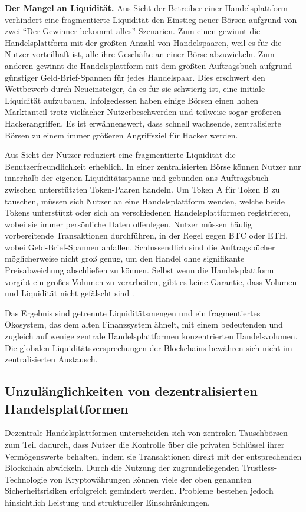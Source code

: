 \documentclass[UTF8,nofonts]{article}
\begin{document}
\begin{multicols}{2}
\textbf{Der Mangel an Liquidität.} Aus Sicht der Betreiber einer Handelsplattform verhindert eine fragmentierte Liquidität den Einstieg neuer Börsen aufgrund von zwei \enquote{Der Gewinner bekommt alles}-Szenarien. Zum einen gewinnt die Handelsplattform mit der größten Anzahl von Handelspaaren, weil es für die Nutzer vorteilhaft ist, alle ihre Geschäfte an einer Börse abzuwickeln. Zum anderen gewinnt die Handelsplattform mit dem größten Auftragsbuch aufgrund günstiger Geld-Brief-Spannen für jedes Handelspaar. Dies erschwert den Wettbewerb durch Neueinsteiger, da es für sie schwierig ist, eine initiale Liquidität aufzubauen. Infolgedessen haben einige Börsen einen hohen Marktanteil trotz vielfacher Nutzerbeschwerden und teilweise sogar größeren Hackerangriffen. Es ist erwähnenswert, dass schnell wachsende, zentralisierte Börsen zu einem immer größeren Angriffsziel für Hacker werden.

Aus Sicht der Nutzer reduziert eine fragmentierte Liquidität die Benutzerfreundlichkeit erheblich. In einer zentralisierten Börse können Nutzer nur innerhalb der eigenen Liquiditätsspanne und gebunden ans Auftragsbuch zwischen unterstützten Token-Paaren handeln. Um Token A für Token B zu tauschen, müssen sich Nutzer an eine Handelsplattform wenden, welche beide Tokens unterstützt oder sich an verschiedenen Handelsplattformen registrieren, wobei sie immer persönliche Daten offenlegen. Nutzer müssen häufig vorbereitende Transaktionen durchführen, in der Regel gegen BTC oder ETH, wobei Geld-Brief-Spannen anfallen. Schlussendlich sind die Auftragsbücher möglicherweise nicht groß genug, um den Handel ohne signifikante Preisabweichung abschließen zu können. Selbst wenn die Handelsplattform vorgibt ein großes Volumen zu verarbeiten, gibt es keine Garantie, dass Volumen und Liquidität nicht gefälscht sind \cite{fakevolume}.

Das Ergebnis sind getrennte Liquiditätsmengen und ein fragmentiertes Ökosystem, das dem alten Finanzsystem ähnelt, mit einem bedeutenden und zugleich auf wenige zentrale Handelsplattformen konzentrierten Handelsvolumen. Die globalen Liquiditätsversprechungen der Blockchains bewähren sich nicht im zentralisierten Austausch.

\subsection{Unzulänglichkeiten von dezentralisierten Handelsplattformen}
Dezentrale Handelsplattformen unterscheiden sich von zentralen Tauschbörsen zum Teil dadurch, dass Nutzer die Kontrolle über die privaten Schlüssel ihrer Vermögenswerte behalten, indem sie Transaktionen direkt mit der entsprechenden Blockchain abwickeln. Durch die Nutzung der zugrundeliegenden Trustless-Technologie von Kryptowährungen können viele der oben genannten Sicherheitsrisiken erfolgreich gemindert werden. Probleme bestehen jedoch hinsichtlich Leistung und struktureller Einschränkungen.


\end{multicols}
\end{document}
